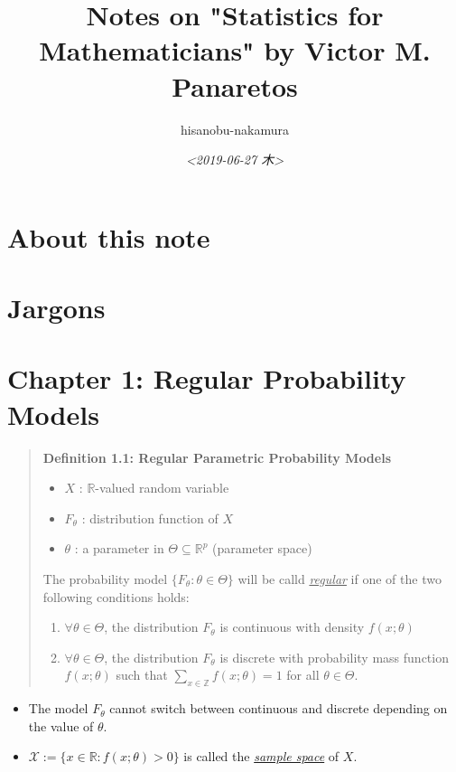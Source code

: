 \documentclass{article}
\author{hisanobu-nakamura}
\date{\textit{<2019-06-27 木>}}
\title{Notes on "Statistics for Mathematicians" by Victor M. Panaretos}
\begin{document}
\maketitle
\tableofcontents




\section{About this note}
\label{sec-1}

\section{Jargons}
\label{sec-2}

\section{Chapter 1: Regular Probability Models}
\label{sec-3}
\begin{quote}
\textbf{Definition 1.1: Regular Parametric Probability Models}\\
\begin{itemize}
\item $X$ : $\mathbb{R}$-valued random variable
\item $F_{\theta}$ : distribution function of $X$
\item $\theta$ : a parameter in $\Theta \subseteq \mathbb{R}^{p}$ (parameter space)
\end{itemize}

The probability model $\{F_{\theta} : \theta \in \Theta\}$ will be calld \emph{\uline{regular}} if one of the two following conditions holds:

\begin{enumerate}
\item $\forall \theta  \in \Theta$, the distribution $F_{\theta}$ is continuous with density $f(x; \theta)$
\item $\forall \theta  \in \Theta$, the distribution $F_{\theta}$ is discrete with probability mass function $f(x;\theta)$ such that $\sum_{x \in \mathbb{Z}} f(x;\theta) = 1$ for all $\theta \in \Theta$.
\end{enumerate}
\end{quote}

\begin{itemize}
\item The model $F_{\theta}$ cannot switch between continuous and discrete depending on the value of $\theta$.
\item $\mathcal{X} := \{x \in \mathbb{R}: f(x;\theta) > 0 \}$ is called the \emph{\uline{sample space}} of $X$.
\end{itemize}
\end{document}
